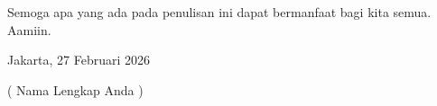 Semoga apa yang ada pada penulisan ini dapat bermanfaat bagi kita semua. Aamiin.

\vspace{1.5cm}

\begin{flushright}
	Jakarta, 27 Februari 2026 \\ %
	\vspace{0.2cm}
	
	
	\vspace{1.5cm} %
	
	( Nama Lengkap Anda )
\end{flushright}